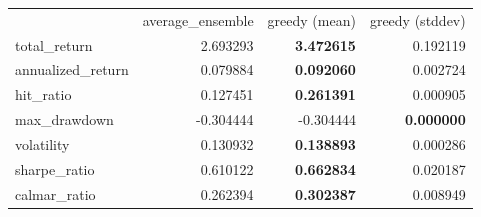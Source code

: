 \begin{tabular}{lrrr}
 & average_ensemble & greedy (mean) & greedy (stddev) \\
total_return & 2.693293 & \bfseries 3.472615 & 0.192119 \\
annualized_return & 0.079884 & \bfseries 0.092060 & 0.002724 \\
hit_ratio & 0.127451 & \bfseries 0.261391 & 0.000905 \\
max_drawdown & -0.304444 & -0.304444 & \bfseries 0.000000 \\
volatility & 0.130932 & \bfseries 0.138893 & 0.000286 \\
sharpe_ratio & 0.610122 & \bfseries 0.662834 & 0.020187 \\
calmar_ratio & 0.262394 & \bfseries 0.302387 & 0.008949 \\
\end{tabular}
